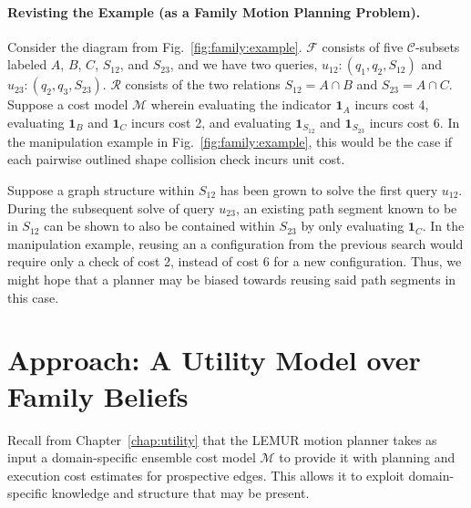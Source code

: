 \paragraph{Revisting the Example (as a Family Motion Planning Problem).}
Consider the diagram from Fig.~\ref{fig:family:example}.
$\mathcal{F}$ consists of five $\mathcal{C}$-subsets labeled
$A$, $B$, $C$, $S_{12}$, and $S_{23}$,
and we have two queries,
$u_{12}: (q_1, q_2, S_{12})$
and
$u_{23}: (q_2, q_3, S_{23})$.
$\mathcal{R}$ consists of the two relations
$S_{12} = A \cap B$ and $S_{23} = A \cap C$.
Suppose a cost model $\mathcal{M}$
wherein evaluating the indicator
$\mathbf{1}_A$ incurs cost 4,
evaluating $\mathbf{1}_B$ and $\mathbf{1}_C$ incurs cost 2,
and evaluating $\mathbf{1}_{S_{12}}$ and $\mathbf{1}_{S_{23}}$
incurs cost 6.
In the manipulation example in
Fig.~\ref{fig:family:example},
this would be the case if each
pairwise outlined shape collision check incurs unit cost.

Suppose a graph structure within ${S_{12}}$ has been grown to solve
the first query $u_{12}$.
During the subsequent solve of query $u_{23}$,
an existing path segment known to be in ${S_{12}}$ can be shown to
also be contained within ${S_{23}}$ by only evaluating $\mathbf{1}_C$.
In the manipulation example,
reusing an a configuration from the previous search
would require only a check of cost 2,
instead of cost 6 for a new configuration.
Thus, we might hope that a planner may be biased towards reusing
said path segments in this case.


\section{Approach: A Utility Model over Family Beliefs}
\label{sec:family:approach}

Recall from Chapter~\ref{chap:utility}
that the LEMUR motion planner takes as input
a domain-specific ensemble cost model
$\mathcal{M}$ to provide it with planning and execution cost
estimates for prospective edges.
This allows it to exploit domain-specific
knowledge and structure that may be present.

